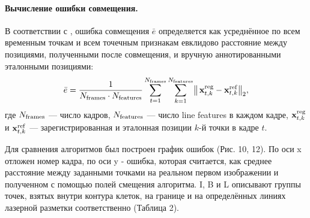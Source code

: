 \documentclass[12pt]{article}
\begin{document}
\paragraph{Вычисление ошибки совмещения.}  
В соответствии с \cite{sorokin2014nonrigid}, ошибка совмещения \(\bar{e}\) определяется как усреднённое по всем временным точкам и всем точечным признакам евклидово расстояние между позициями, полученными после совмещения, и вручную аннотированными эталонными позициями:
\[
\bar{e} = \frac{1}{N_{\rm frames} \cdot N_{\rm features}}
\sum_{t=1}^{N_{\rm frames}}
\sum_{k=1}^{N_{\rm features}}
\bigl\|\,\mathbf{x}_{t,k}^{\rm reg} - \mathbf{x}_{t,k}^{\rm ref}\bigr\|_2,
\]
где \(N_{\rm frames}\) — число кадров, \(N_{\rm features}\) — число line features в каждом кадре, \(\mathbf{x}_{t,k}^{\rm reg}\) и \(\mathbf{x}_{t,k}^{\rm ref}\) — зарегистрированная и эталонная позиции \(k\)-й точки в кадре \(t\).

Для сравнения алгоритмов был построен график ошибок (Рис. 10, 12). По оси x отложен номер кадра, по оси y - ошибка, которая считается, как среднее расстояние между заданными точками на реальном первом изображении и полученном с помощью полей смещения алгоритма. I, B и L описывают группы точек, взятых внутри контура клеток, на границе и на определённых линиях лазерной разметки соответственно (Таблица 2).
\end{document}
